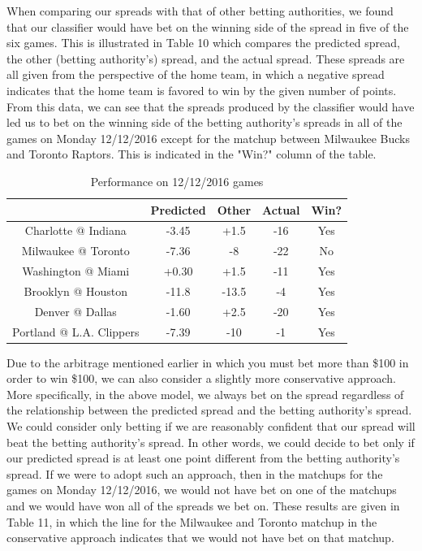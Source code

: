 \documentclass{article}
\begin{document}
When comparing our spreads with that of other betting authorities, we found that our classifier would have bet on the winning side of the spread in five of the six games. This is illustrated in Table 10 which compares the predicted spread, the other (betting authority's) spread, and the actual spread. These spreads are all given from the perspective of the home team, in which a negative spread indicates that the home team is favored to win by the given number of points. From this data, we can see that the spreads produced by the classifier would have led us to bet on the winning side of the betting authority's spreads in all of the games on Monday 12/12/2016 except for the matchup between Milwaukee Bucks and Toronto Raptors. This is indicated in the "Win?" column of the table.


\begin{table}
  \begin{center}
    \begin{tabular}{ | c | c | c | c | c | }
      \hline
                                & Predicted     & Other  & Actual & Win?  \\ \hline
      Charlotte @ Indiana       & -3.45         & +1.5   & -16    & Yes   \\ \hline
      Milwaukee @ Toronto       & -7.36         & -8     & -22    & No   \\ \hline
      Washington @ Miami        & +0.30         & +1.5   & -11    & Yes    \\ \hline
      Brooklyn @ Houston        & -11.8         & -13.5  & -4     & Yes   \\ \hline
      Denver @ Dallas           & -1.60         & +2.5   & -20    & Yes   \\ \hline
      Portland @ L.A. Clippers  & -7.39         & -10    & -1     & Yes   \\ \hline
    \end{tabular}
  \end{center}
  \caption{Performance on 12/12/2016 games}
\end{table}

Due to the arbitrage mentioned earlier in which you must bet more than \$100 in order to win \$100, we can also consider a slightly more conservative approach. More specifically, in the above model, we always bet on the spread regardless of the relationship between the predicted spread and the betting authority's spread. We could consider only betting if we are reasonably confident that our spread will beat the betting authority's spread. In other words, we could decide to bet only if our predicted spread is at least one point different from the betting authority's spread. If we were to adopt such an approach, then in the matchups for the games on Monday 12/12/2016, we would not have bet on one of the matchups and we would have won all of the spreads we bet on. These results are given in Table 11, in which the line for the Milwaukee and Toronto matchup in the conservative approach indicates that we would not have bet on that matchup.
\end{document}
